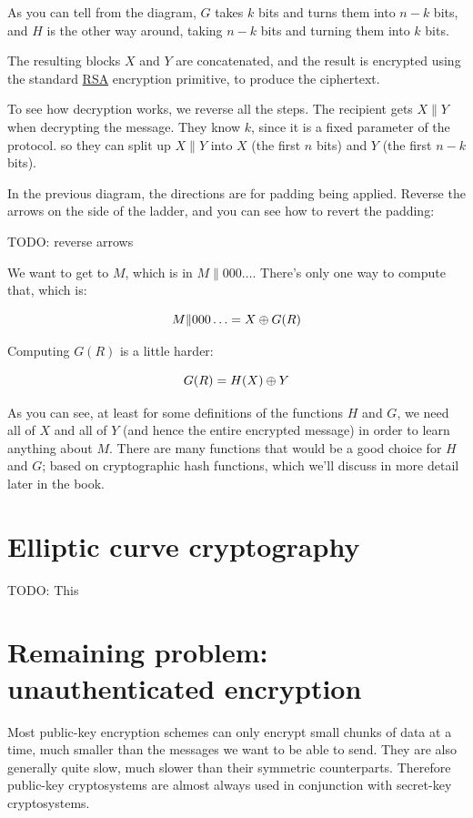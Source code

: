 \documentclass[11pt,ebook,table,dvipsnames]{memoir}
\begin{document}
As you can tell from the diagram, $G$ takes $k$ bits and turns them
into $n - k$ bits, and $H$ is the other way around, taking $n - k$
bits and turning them into $k$ bits.

The resulting blocks $X$ and $Y$ are concatenated, and the result is
encrypted using the standard \hyperref[RSA]{RSA} encryption primitive, to produce the
ciphertext.

To see how decryption works, we reverse all the steps. The recipient
gets $X \| Y$ when decrypting the message. They know $k$, since it is a
fixed parameter of the protocol. so they can split up $X \| Y$ into
$X$ (the first $n$ bits) and $Y$ (the first $n - k$ bits).

In the previous diagram, the directions are for padding being applied.
Reverse the arrows on the side of the ladder, and you can see how to
revert the padding:

TODO: reverse arrows

We want to get to $M$, which is in $M \| 000\ldots$. There's only one
way to compute that, which is:

\[
M \| 000\ldots = X \oplus G(R)
\]

Computing $G(R)$ is a little harder:

\[
G(R) = H(X) \oplus Y
\]

As you can see, at least for some definitions of the functions $H$ and
$G$, we need all of $X$ and all of $Y$ (and hence the entire encrypted
message) in order to learn anything about $M$. There are many
functions that would be a good choice for $H$ and $G$; based on
cryptographic hash functions, which we'll discuss in more detail later
in the book.
\section{Elliptic curve cryptography}
\label{sec-2-5-4}

TODO: This
\section{Remaining problem: unauthenticated encryption}
\label{sec-2-5-5}

Most \gls{public-key encryption} schemes can only encrypt small chunks
of data at a time, much smaller than the messages we want to be able
to send. They are also generally quite slow, much slower than their
symmetric counterparts. Therefore public-key cryptosystems are almost
always used in conjunction with secret-key cryptosystems.
\end{document}
